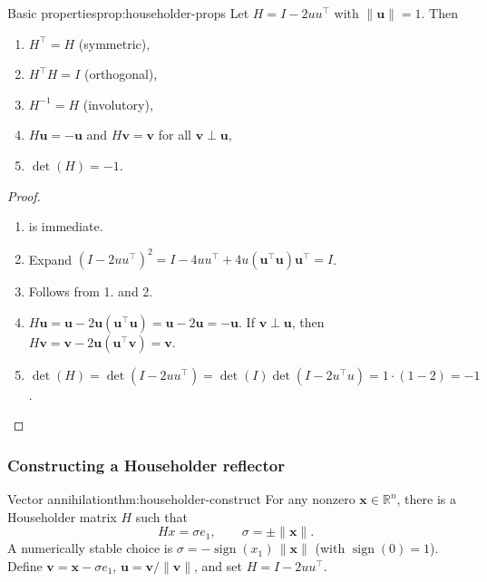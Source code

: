 \begin{proposition}{Basic properties}{prop:householder-props}
    Let $H=I-2uu^\top$ with $\|\mathbf{u}\|=1$. Then
    \begin{enumerate}
        \item $H^\top=H$ (symmetric),
        \item $H^\top H=I$ (orthogonal),
        \item $H^{-1}=H$ (involutory),
        \item $H\mathbf{u} = -\mathbf{u}$ and $H\mathbf{v} = \mathbf{v}$ for all $\mathbf{v} \perp \mathbf{u}$,
        \item $\det(H)=-1$.
    \end{enumerate}
\end{proposition}
\begin{proof}
    \begin{enumerate}
        \item is immediate.
        \item Expand $(I-2uu^\top)^2=I-4uu^\top+4u(\mathbf{u}^\top \mathbf{u})\mathbf{u}^\top=I$.
        \item Follows from 1. and 2.
        \item $H\mathbf{u}=\mathbf{u}-2\mathbf{u}(\mathbf{u}^\top \mathbf{u})=\mathbf{u}-2\mathbf{u}=-\mathbf{u}$.
              If $\mathbf{v}\perp \mathbf{u}$, then $H\mathbf{v}=\mathbf{v}-2\mathbf{u}(\mathbf{u}^\top \mathbf{v})=\mathbf{v}$.
        \item $\det(H)=\det(I-2uu^\top)=\det(I)\det(I-2u^\top u)=1\cdot(1-2)=-1$.
    \end{enumerate}
\end{proof}

\subsubsection{Constructing a Householder reflector}

\begin{theorem}{Vector annihilation}{thm:householder-construct}
    For any nonzero $\mathbf{x}\in\mathbb{R}^n$, there is a Householder matrix $H$ such that
    \[
        Hx = \sigma e_1,\qquad \sigma=\pm\|\mathbf{x}\|.
    \]
    A numerically stable choice is $\displaystyle \sigma = -\operatorname{sign}(x_1)\,\|\mathbf{x}\|$ (with $\operatorname{sign}(0)=1$).
    Define $\mathbf{v}=\mathbf{x}-\sigma e_1$, $\mathbf{u}=\mathbf{v}/\|\mathbf{v}\|$, and set $H=I-2uu^\top$.
\end{theorem}

